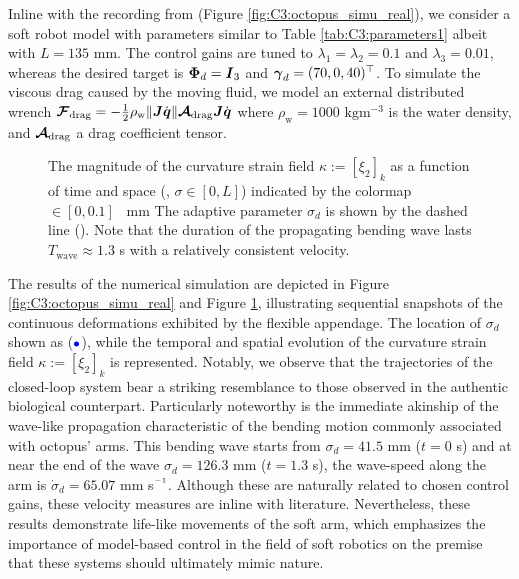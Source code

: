 Inline with the recording from \cite{Sumbre2001Sep} (Figure \ref{fig:C3:octopus_simu_real}), we consider a soft robot model with parameters similar to Table \ref{tab:C3:parameters1} albeit with $L = 135$ \si{\milli \meter}. The control gains are tuned to $\lambda_1 = \lambda_2 = 0.1$ and $\lambda_3 = 0.01$, whereas the desired target is ${\boldsymbol{\Phi}}_d = {\boldsymbol{I}}_3$ and ${\boldsymbol{\gamma}}_d = (70, 0, 40)^\top$. To simulate the viscous drag caused by the moving fluid, we model an external distributed wrench $\boldsymbol{\mathcal{F}}_{\textrm{drag}} = -\frac{1}{2}\rho_{\textrm{w}} \lVert{\boldsymbol{J}} {\dot{\boldsymbol{q}}}\rVert \boldsymbol{\mathcal{A}}_{\textrm{drag}} {\boldsymbol{J}} {\dot{\boldsymbol{q}}} $ where $\rho_{\textrm{w}} = 1000$ $\text{kg}\text{m}^{-3}$ is the water density, and $\boldsymbol{\mathcal{A}}_{\textrm{drag}}$ a drag coefficient tensor. %
\vspace{1mm}
\begin{figure}[!t]
  \centering
  \vspace{-2mm}
  
  \vspace{-7mm}
  \caption{\small The magnitude of the curvature strain field $\kappa:=[\xi_2]_k$ as a function of time and space (\ie, $\sigma \in [0,L]$) indicated by the colormap \protect{}$\!\!\in [0,0.1]$ \si{\per \milli \meter } The adaptive parameter $\sigma_d$ is shown by the dashed line (). Note that the duration of the propagating bending wave lasts $T_{\textrm{wave}} \approx 1.3$ s with a relatively consistent velocity. }\label{fig:C3:bend_propogate}
  \vspace{-4mm}
\end{figure}
The results of the numerical simulation are depicted in Figure \ref{fig:C3:octopus_simu_real} and Figure \ref{fig:C3:bend_propogate}, illustrating sequential snapshots of the continuous deformations exhibited by the flexible appendage. The location of $\sigma_d$ shown as ($\textcolor{blue}{\bullet}$), while the temporal and spatial evolution of the curvature strain field $\kappa:=[\xi_2]_k$ is represented. Notably, we observe that the trajectories of the closed-loop system bear a striking resemblance to those observed in the authentic biological counterpart. Particularly noteworthy is the immediate akinship of the wave-like propagation characteristic of the bending motion commonly associated with octopus' arms. This bending wave starts from $\sigma_d = 41.5$ mm ($t=0$ s) and at near the end of the wave $\sigma_d = 126.3$ mm ($t=1.3$ s), the wave-speed along the arm is $\dot{\sigma}_d = 65.07$ mm s$\inv$. Although these are naturally related to chosen control gains, these velocity measures are inline with literature. Nevertheless, these results demonstrate life-like movements of the soft arm, which emphasizes the importance of model-based control in the field of soft robotics on the premise that these systems should ultimately mimic nature.

